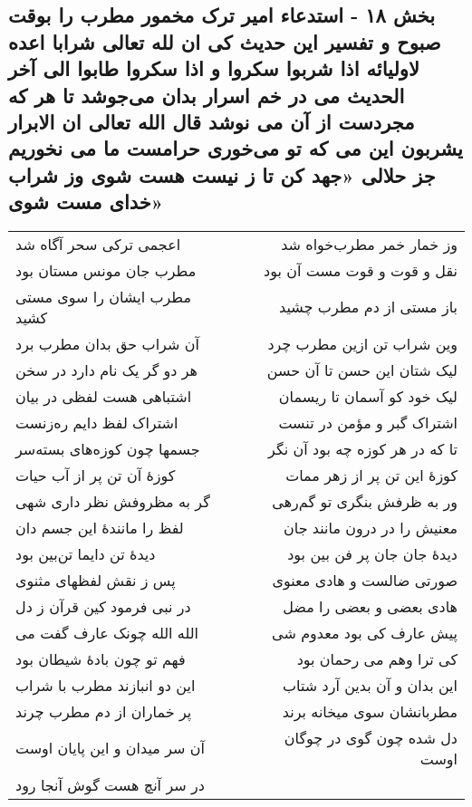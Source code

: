 \begin{center}
\section*{بخش ۱۸ - استدعاء امیر ترک مخمور مطرب را بوقت صبوح و تفسیر این حدیث کی ان لله تعالی شرابا اعده لاولیائه اذا شربوا سکروا و اذا سکروا طابوا الی آخر الحدیث می در خم اسرار بدان می‌جوشد تا هر که مجردست از آن می نوشد قال الله تعالی ان الابرار یشربون این می که تو می‌خوری حرامست  ما می نخوریم جز حلالی «جهد کن تا ز نیست هست شوی  وز شراب خدای مست شوی»}
\label{sec:sh018}
\begin{longtable}{l p{0.5cm} r}
اعجمی ترکی سحر آگاه شد
&&
وز خمار خمر مطرب‌خواه شد
\\
مطرب جان مونس مستان بود
&&
نقل و قوت و قوت مست آن بود
\\
مطرب ایشان را سوی مستی کشید
&&
باز مستی از دم مطرب چشید
\\
آن شراب حق بدان مطرب برد
&&
وین شراب تن ازین مطرب چرد
\\
هر دو گر یک نام دارد در سخن
&&
لیک شتان این حسن تا آن حسن
\\
اشتباهی هست لفظی در بیان
&&
لیک خود کو آسمان تا ریسمان
\\
اشتراک لفظ دایم ره‌زنست
&&
اشتراک گبر و مؤمن در تنست
\\
جسمها چون کوزه‌های بسته‌سر
&&
تا که در هر کوزه چه بود آن نگر
\\
کوزهٔ آن تن پر از آب حیات
&&
کوزهٔ این تن پر از زهر ممات
\\
گر به مظروفش نظر داری شهی
&&
ور به ظرفش بنگری تو گم‌رهی
\\
لفظ را مانندهٔ این جسم دان
&&
معنیش را در درون مانند جان
\\
دیدهٔ تن دایما تن‌بین بود
&&
دیدهٔ جان جان پر فن بین بود
\\
پس ز نقش لفظهای مثنوی
&&
صورتی ضالست و هادی معنوی
\\
در نبی فرمود کین قرآن ز دل
&&
هادی بعضی و بعضی را مضل
\\
الله الله چونک عارف گفت می
&&
پیش عارف کی بود معدوم شی
\\
فهم تو چون بادهٔ شیطان بود
&&
کی ترا وهم می رحمان بود
\\
این دو انبازند مطرب با شراب
&&
این بدان و آن بدین آرد شتاب
\\
پر خماران از دم مطرب چرند
&&
مطربانشان سوی میخانه برند
\\
آن سر میدان و این پایان اوست
&&
دل شده چون گوی در چوگان اوست
\\
در سر آنچ هست گوش آنجا رود

\end{longtable}
\end{center}
